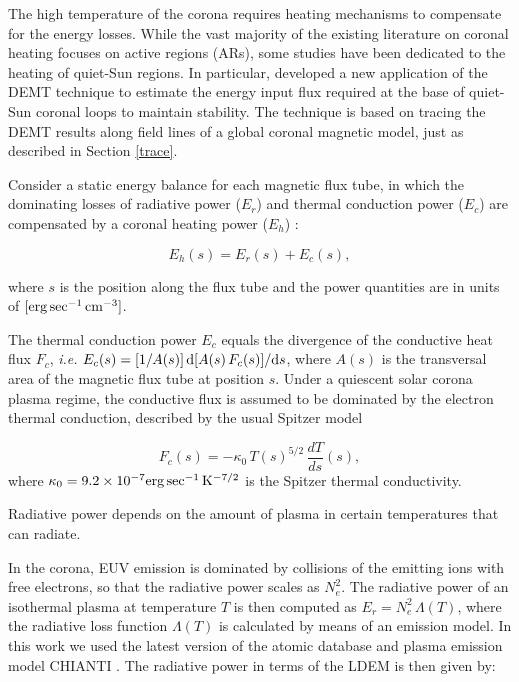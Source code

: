 \documentclass[namedreferences]{solarphysics}
\begin{document}
\begin{article}
{The high temperature of the corona requires heating mechanisms to compensate for the energy losses. While the vast majority of the existing literature on coronal heating focuses on active regions (ARs), some studies have been dedicated to the heating of quiet-Sun regions. In particular,  \citet{maccormack_2017} developed a new application of the DEMT technique to estimate the energy input flux required at the base of quiet-Sun coronal loops to maintain stability. The technique is based on tracing the DEMT results along field lines of a global coronal magnetic model, just as described in Section \ref{trace}.}

{Consider} a static energy balance for each magnetic flux tube, {in which the dominating losses of} radiative power ($E_r$) and thermal conduction power ($E_c$) are compensated {by a} coronal heating power ($E_h$) \citep{aschwanden_2004}:

\begin{equation}\label{Balance}
E_h(s) = E_r(s)+ E_c(s),
\end{equation}

\noindent
where $s$ is the position along {the flux tube} and the {power quantities} are in units of $[{\rm erg\,sec^{-1}\,cm^{-3}}]$.

{The thermal conduction power $E_c$ equals the divergence of the conductive heat flux $F_c$, \textit{i.e.} $E_c(s)=[1/A(s)]\,{\rm d}[A(s)\,F_c(s)]/{\rm d}s$, where $A(s)$ is the transversal area of the magnetic flux tube at position $s$. Under a quiescent solar corona plasma regime, the conductive flux is assumed to be dominated by the electron thermal conduction, described by the usual Spitzer model \citep{spitzer_1962}

\begin{equation}\label{Fc}
F_c(s)=-\kappa_0\,{T(s)}^{5/2}\,\frac{dT}{ds}(s),
\end{equation}
where $\kappa_0 = 9.2 \times 10^{-7}  {\rm erg\,sec^{-1}\,K^{-7/2}}$ is the Spitzer thermal conductivity.}

Radiative power depends on the amount of plasma in certain temperatures that can radiate.

{In the corona, EUV emission is dominated by collisions of the emitting ions with free electrons, so that the radiative power scales as $N_e^2$. The radiative power of an isothermal plasma at temperature $T$ is then computed as $E_r=N_e^2\,\Lambda(T)$, where the radiative loss function $\Lambda(T)$ is calculated by means of an emission model. In this work we used the latest version of the atomic database and plasma emission model CHIANTI \citep{delzanna_2015}. The radiative power in terms of the LDEM is then given by:}


\end{article}
\end{document}
